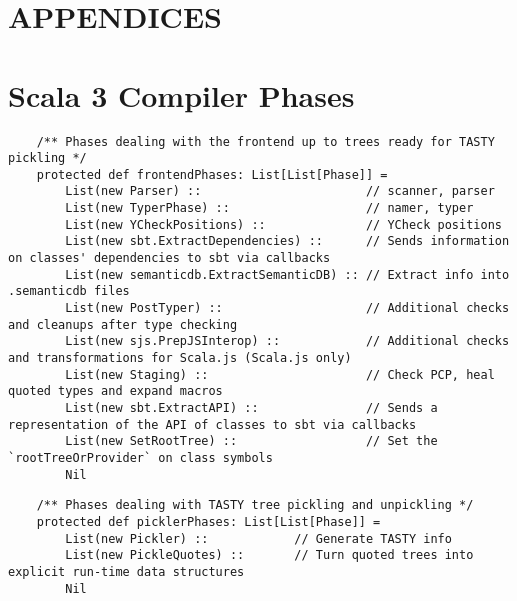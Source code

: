 \documentclass[letterpaper,12pt,titlepage,oneside,final]{book}
\begin{document}
\appendix
\chapter*{APPENDICES}

\chapter{Scala 3 Compiler Phases}
\label{appendix:dotty-phases}
\begin{verbatim}
	/** Phases dealing with the frontend up to trees ready for TASTY pickling */
	protected def frontendPhases: List[List[Phase]] =
		List(new Parser) ::                       // scanner, parser
		List(new TyperPhase) ::                   // namer, typer
		List(new YCheckPositions) ::              // YCheck positions
		List(new sbt.ExtractDependencies) ::      // Sends information on classes' dependencies to sbt via callbacks
		List(new semanticdb.ExtractSemanticDB) :: // Extract info into .semanticdb files
		List(new PostTyper) ::                    // Additional checks and cleanups after type checking
		List(new sjs.PrepJSInterop) ::            // Additional checks and transformations for Scala.js (Scala.js only)
		List(new Staging) ::                      // Check PCP, heal quoted types and expand macros
		List(new sbt.ExtractAPI) ::               // Sends a representation of the API of classes to sbt via callbacks
		List(new SetRootTree) ::                  // Set the `rootTreeOrProvider` on class symbols
		Nil
\end{verbatim}

\begin{verbatim}
	/** Phases dealing with TASTY tree pickling and unpickling */
	protected def picklerPhases: List[List[Phase]] =
		List(new Pickler) ::            // Generate TASTY info
		List(new PickleQuotes) ::       // Turn quoted trees into explicit run-time data structures
		Nil
\end{verbatim}
\end{document}
